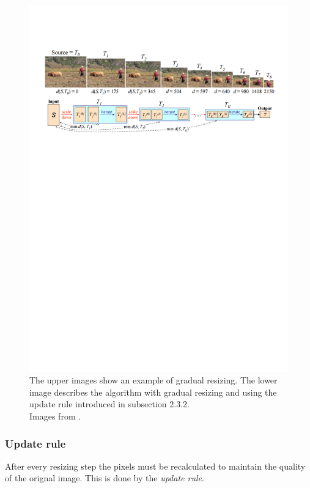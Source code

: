 \begin{figure}[h]
\centering
\includegraphics[scale=0.8]{img/gradualresizing}
\caption[Gradual resizing]{The upper images show an example of gradual resizing. The lower image describes the algorithm with gradual resizing and using the update rule introduced in subsection 2.3.2.\\ Images from \cite{bisi}. }
\label{fig:Gradual resizing}
\end{figure}

\subsubsection{Update rule}
After every resizing step the pixels must be recalculated to maintain the quality of the orignal image. This is done by the \textit{update rule}.

